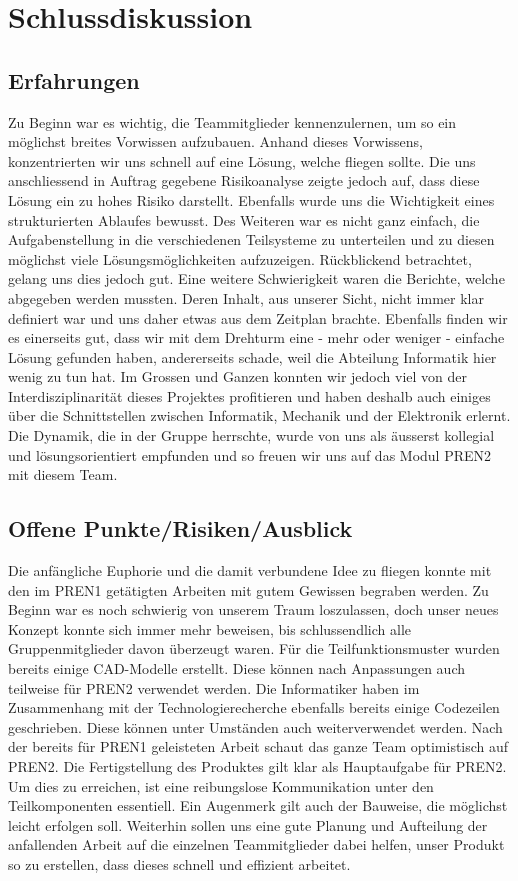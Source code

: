 \section{Schlussdiskussion}

\subsection{Erfahrungen}

Zu Beginn war es wichtig, die Teammitglieder kennenzulernen, um so ein 
möglichst breites Vorwissen aufzubauen. Anhand dieses Vorwissens, 
konzentrierten wir uns schnell auf eine Lösung, welche fliegen sollte. Die uns 
anschliessend in Auftrag gegebene Risikoanalyse zeigte jedoch auf, dass diese 
Lösung ein zu hohes Risiko darstellt. Ebenfalls wurde uns die Wichtigkeit 
eines strukturierten Ablaufes bewusst. Des Weiteren war es nicht ganz  
einfach, die Aufgabenstellung in die verschiedenen Teilsysteme zu unterteilen  
und zu diesen möglichst viele Lösungsmöglichkeiten aufzuzeigen.  Rückblickend 
betrachtet, gelang uns dies jedoch gut. Eine weitere Schwierigkeit waren die 
Berichte, welche abgegeben werden mussten.  Deren Inhalt, aus unserer Sicht, 
nicht immer klar definiert war und uns daher etwas aus dem Zeitplan brachte.  
Ebenfalls finden wir es einerseits gut, dass wir mit dem Drehturm eine - mehr 
oder weniger - einfache Lösung gefunden haben, andererseits schade, weil die 
Abteilung Informatik hier wenig zu tun hat. Im Grossen und Ganzen konnten wir 
jedoch viel von der Interdisziplinarität dieses Projektes profitieren und 
haben deshalb auch einiges über die Schnittstellen zwischen Informatik, 
Mechanik und der Elektronik erlernt. Die Dynamik, die in der Gruppe herrschte, 
wurde von uns als äusserst kollegial und lösungsorientiert empfunden und so 
freuen wir uns auf das Modul PREN2 mit diesem Team.  

\subsection{Offene Punkte/Risiken/Ausblick}

Die anfängliche Euphorie und die damit verbundene Idee zu fliegen konnte mit 
den im PREN1 getätigten Arbeiten mit gutem Gewissen begraben werden. Zu 
Beginn war es noch schwierig von unserem Traum loszulassen, doch unser neues 
Konzept konnte sich immer mehr beweisen, bis schlussendlich alle 
Gruppenmitglieder davon überzeugt waren.
Für die Teilfunktionsmuster wurden bereits einige CAD-Modelle erstellt. Diese 
können nach Anpassungen auch teilweise für PREN2 verwendet werden. Die 
Informatiker haben im Zusammenhang mit der Technologierecherche ebenfalls 
bereits einige Codezeilen geschrieben. Diese können unter Umständen auch 
weiterverwendet werden.
Nach der bereits für PREN1 geleisteten Arbeit schaut das ganze Team 
optimistisch auf PREN2. Die Fertigstellung des Produktes gilt klar als 
Hauptaufgabe für PREN2. Um dies zu erreichen, ist eine reibungslose 
Kommunikation unter den Teilkomponenten essentiell. Ein Augenmerk gilt auch 
der Bauweise, die möglichst leicht erfolgen soll. Weiterhin sollen uns eine 
gute Planung und Aufteilung der anfallenden Arbeit auf die einzelnen 
Teammitglieder dabei helfen, unser Produkt so zu erstellen, dass dieses 
schnell und effizient arbeitet.
